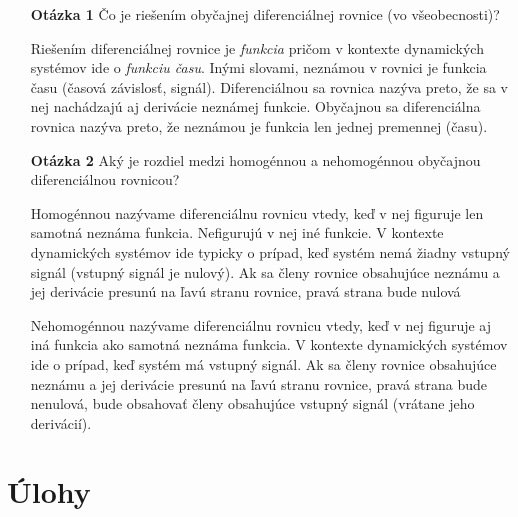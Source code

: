 \documentclass[a4paper, 10pt, ]{article}
\begin{document}
\noindent
\begin{itemize}[leftmargin=0pt, labelsep=3mm, itemsep=0pt]
    


	\item[\textsf{\bfseries Otázka 1}] {\sffamily Čo je riešením obyčajnej diferenciálnej rovnice (vo všeobecnosti)?}
	
    Riešením diferenciálnej rovnice je \emph{funkcia} pričom v kontexte dynamických systémov ide o \emph{funkciu času}. 
    Inými slovami, neznámou v rovnici je funkcia času (časová závislosť, signál). Diferenciálnou sa rovnica nazýva preto, že sa v nej nachádzajú aj derivácie neznámej funkcie. Obyčajnou sa diferenciálna rovnica nazýva preto, že neznámou je funkcia len jednej premennej (času).



    \item[\textsf{\bfseries Otázka 2}] {\sffamily Aký je rozdiel medzi homogénnou a nehomogénnou obyčajnou diferenciálnou rovnicou?}
    
    Homogénnou nazývame diferenciálnu rovnicu vtedy, keď v nej figuruje len samotná neznáma funkcia. Nefigurujú v nej iné funkcie. V kontexte dynamických systémov ide typicky o prípad, keď systém nemá žiadny vstupný signál (vstupný signál je nulový). Ak sa členy rovnice obsahujúce neznámu a jej derivácie presunú na ľavú stranu rovnice, pravá strana bude nulová
    
    Nehomogénnou nazývame diferenciálnu rovnicu vtedy, keď v nej figuruje aj iná funkcia ako samotná neznáma funkcia. V kontexte dynamických systémov ide o prípad, keď systém má vstupný signál. Ak sa členy rovnice obsahujúce neznámu a jej derivácie presunú na ľavú stranu rovnice, pravá strana bude nenulová, bude obsahovať členy obsahujúce vstupný signál (vrátane jeho derivácií).



\end{itemize}






\section{Úlohy}
\end{document}
